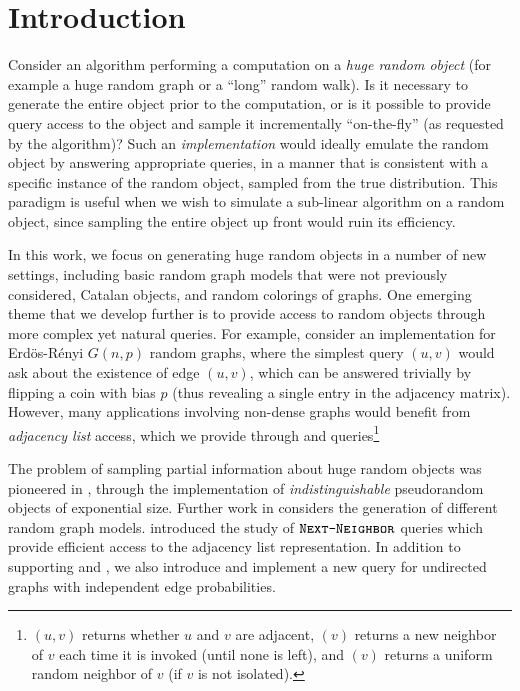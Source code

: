 \section{Introduction}
Consider an algorithm performing a computation on a \emph{huge random object} (for example a huge random graph or a ``long'' random walk).
Is it necessary to generate the entire object prior to the computation,
or is it possible to provide query access to the object and sample it incrementally ``on-the-fly'' (as requested by the algorithm)?
Such an \emph{implementation} would ideally emulate the random object by answering appropriate queries,
in a manner that is consistent with a specific instance of the random object, sampled from the true distribution.
This paradigm is useful when we wish to simulate a sub-linear algorithm on a random object,
since sampling the entire object up front would ruin its efficiency.

In this work, we focus on generating huge random objects in a number of new settings,
including basic random graph models that were not previously considered, Catalan objects, and random colorings of graphs.
One emerging theme that we develop further is to provide access to random objects through more complex yet natural queries.
For example, consider an implementation for Erd\"os-R\'enyi $G(n,p)$ random graphs,
where the simplest query $(u,v)$ would ask about the existence of edge $(u,v)$,
which can be answered trivially by flipping a coin with bias $p$ (thus revealing a single entry in the adjacency matrix).
However, many applications involving non-dense graphs would benefit from \emph{adjacency list} access,
which we provide through  and  queries\footnote{
\label{foot:graph_queries}
$(u,v)$ returns whether $u$ and $v$ are adjacent, $(v)$ returns a new neighbor of $v$ each time
it is invoked (until none is left), and $(v)$ returns a uniform random neighbor of $v$ (if $v$ is not isolated).}

The problem of sampling partial information about huge random objects was pioneered in \cite{huge,huge_old,huge_journal},
through the implementation of \emph{indistinguishable} pseudorandom objects of exponential size.
Further work in \cite{sparse,reut} considers the generation of different random graph models.
\cite{reut} introduced the study of $\texttt{\textsc{Next-Neighbor}}$ queries which provide efficient access to the adjacency list representation.
In addition to supporting  and ,
we also introduce and implement a new  query for undirected graphs with independent edge probabilities.

